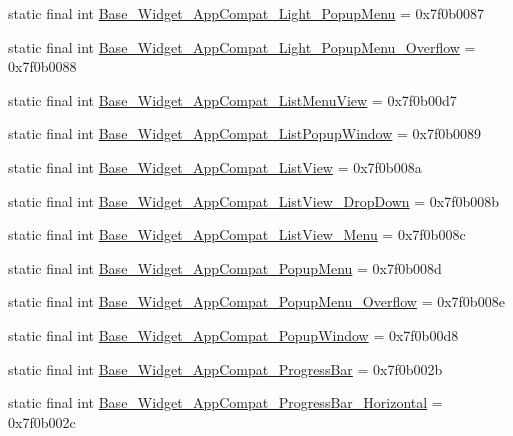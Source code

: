 \begin{CompactItemize}
static final int \hyperlink{classandroid_1_1support_1_1v7_1_1appcompat_1_1_r_1_1style_c27215439cf2eabd4275296b38a36856}{Base\_\-Widget\_\-AppCompat\_\-Light\_\-PopupMenu} = 0x7f0b0087
\item 
static final int \hyperlink{classandroid_1_1support_1_1v7_1_1appcompat_1_1_r_1_1style_451aeeb308a82e2b84ca3668aa3f4a53}{Base\_\-Widget\_\-AppCompat\_\-Light\_\-PopupMenu\_\-Overflow} = 0x7f0b0088
\item 
static final int \hyperlink{classandroid_1_1support_1_1v7_1_1appcompat_1_1_r_1_1style_4e15db4993b8920cf69b1ca82321187e}{Base\_\-Widget\_\-AppCompat\_\-ListMenuView} = 0x7f0b00d7
\item 
static final int \hyperlink{classandroid_1_1support_1_1v7_1_1appcompat_1_1_r_1_1style_ba1dedb7bf07e9f60cb78b6b7ce30917}{Base\_\-Widget\_\-AppCompat\_\-ListPopupWindow} = 0x7f0b0089
\item 
static final int \hyperlink{classandroid_1_1support_1_1v7_1_1appcompat_1_1_r_1_1style_280ea824e373a85fb981d43f9082b1a9}{Base\_\-Widget\_\-AppCompat\_\-ListView} = 0x7f0b008a
\item 
static final int \hyperlink{classandroid_1_1support_1_1v7_1_1appcompat_1_1_r_1_1style_b37ae788547cd21eb5c0e277d05eae09}{Base\_\-Widget\_\-AppCompat\_\-ListView\_\-DropDown} = 0x7f0b008b
\item 
static final int \hyperlink{classandroid_1_1support_1_1v7_1_1appcompat_1_1_r_1_1style_5c3f3e447efe1a2f4a2f134ff3a5c52f}{Base\_\-Widget\_\-AppCompat\_\-ListView\_\-Menu} = 0x7f0b008c
\item 
static final int \hyperlink{classandroid_1_1support_1_1v7_1_1appcompat_1_1_r_1_1style_cdd1dae8271ca2a68bcac4272345eeb7}{Base\_\-Widget\_\-AppCompat\_\-PopupMenu} = 0x7f0b008d
\item 
static final int \hyperlink{classandroid_1_1support_1_1v7_1_1appcompat_1_1_r_1_1style_29c34688dba5fa59b19f20b21e8d80e7}{Base\_\-Widget\_\-AppCompat\_\-PopupMenu\_\-Overflow} = 0x7f0b008e
\item 
static final int \hyperlink{classandroid_1_1support_1_1v7_1_1appcompat_1_1_r_1_1style_aa88af4ded4b9ff966a9246e420a0914}{Base\_\-Widget\_\-AppCompat\_\-PopupWindow} = 0x7f0b00d8
\item 
static final int \hyperlink{classandroid_1_1support_1_1v7_1_1appcompat_1_1_r_1_1style_470476bc26c433bc9b65af414610a4e0}{Base\_\-Widget\_\-AppCompat\_\-ProgressBar} = 0x7f0b002b
\item 
static final int \hyperlink{classandroid_1_1support_1_1v7_1_1appcompat_1_1_r_1_1style_2107f42a67a5c60508b4fa0e8f5cba7b}{Base\_\-Widget\_\-AppCompat\_\-ProgressBar\_\-Horizontal} = 0x7f0b002c

\end{CompactItemize}
